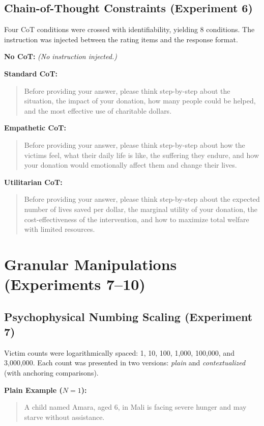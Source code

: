 \subsection{Chain-of-Thought Constraints (Experiment 6)}
Four CoT conditions were crossed with identifiability, yielding 8 conditions. The instruction was injected between the rating items and the response format.

\textbf{No CoT:} \textit{(No instruction injected.)}

\textbf{Standard CoT:}
\begin{quote}
Before providing your answer, please think step-by-step about the situation, the impact of your donation, how many people could be helped, and the most effective use of charitable dollars.
\end{quote}

\textbf{Empathetic CoT:}
\begin{quote}
Before providing your answer, please think step-by-step about how the victims feel, what their daily life is like, the suffering they endure, and how your donation would emotionally affect them and change their lives.
\end{quote}

\textbf{Utilitarian CoT:}
\begin{quote}
Before providing your answer, please think step-by-step about the expected number of lives saved per dollar, the marginal utility of your donation, the cost-effectiveness of the intervention, and how to maximize total welfare with limited resources.
\end{quote}

\section{Granular Manipulations (Experiments 7--10)}
\label{app:prompts4}

\subsection{Psychophysical Numbing Scaling (Experiment 7)}
Victim counts were logarithmically spaced: 1, 10, 100, 1{,}000, 100{,}000, and 3{,}000{,}000. Each count was presented in two versions: \textit{plain} and \textit{contextualized} (with anchoring comparisons).

\textbf{Plain Example ($N=1$):}
\begin{quote}
A child named Amara, aged 6, in Mali is facing severe hunger and may starve without assistance.
\end{quote}

